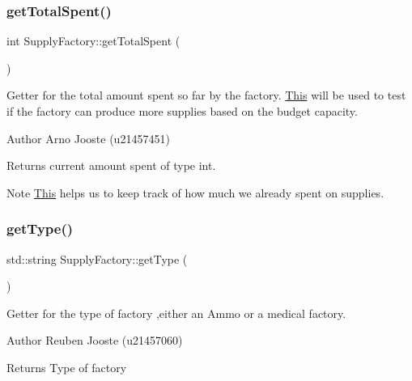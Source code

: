 \subsubsection{\texorpdfstring{getTotalSpent()}{getTotalSpent()}}
{\footnotesize\ttfamily int Supply\+Factory\+::get\+Total\+Spent (\begin{DoxyParamCaption}{ }\end{DoxyParamCaption})}



Getter for the total amount spent so far by the factory. \mbox{\hyperlink{class_this}{This}} will be used to test if the factory can produce more supplies based on the budget capacity. 

\begin{DoxyAuthor}{Author}
Arno Jooste (u21457451) 
\end{DoxyAuthor}
\begin{DoxyReturn}{Returns}
current amount spent of type int. 
\end{DoxyReturn}
\begin{DoxyNote}{Note}
\mbox{\hyperlink{class_this}{This}} helps us to keep track of how much we already spent on supplies. 
\end{DoxyNote}
\mbox{\label{class_supply_factory_a8ddbed1efefb6a93df95f480953d85c6}} 
\subsubsection{\texorpdfstring{getType()}{getType()}}
{\footnotesize\ttfamily std\+::string Supply\+Factory\+::get\+Type (\begin{DoxyParamCaption}{ }\end{DoxyParamCaption})}



Getter for the type of factory ,either an Ammo or a medical factory. 

\begin{DoxyAuthor}{Author}
Reuben Jooste (u21457060) 
\end{DoxyAuthor}
\begin{DoxyReturn}{Returns}
Type of factory 
\end{DoxyReturn}
\mbox{\label{class_supply_factory_a110ff7418c656661e935a33e49300722}} 
